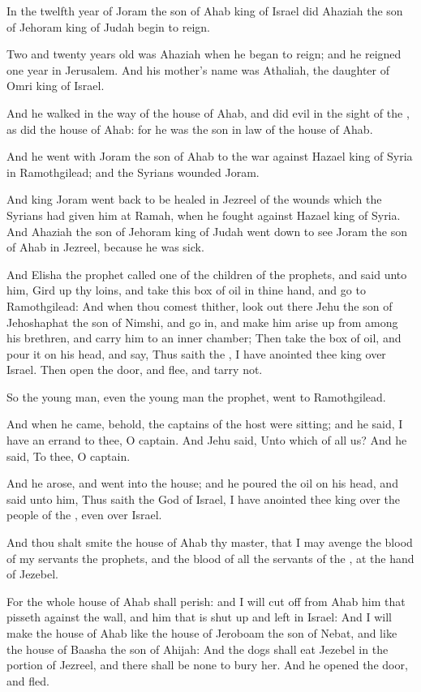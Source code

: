 \Verse In the twelfth year of Joram the son of Ahab king of Israel did Ahaziah the son of Jehoram king of Judah begin to reign.

\Verse Two and twenty years old was Ahaziah when he began to reign; and he reigned one year in Jerusalem. And his mother's name was Athaliah, the daughter of Omri king of Israel.

\Verse And he walked in the way of the house of Ahab, and did evil in the sight of the \LORD, as did the house of Ahab: for he was the son in law of the house of Ahab.

\Verse And he went with Joram the son of Ahab to the war against Hazael king of Syria in Ramothgilead; and the Syrians wounded Joram.

\Verse And king Joram went back to be healed in Jezreel of the wounds which the Syrians had given him at Ramah, when he fought against Hazael king of Syria. And Ahaziah the son of Jehoram king of Judah went down to see Joram the son of Ahab in Jezreel, because he was sick.


\Chapter
\Verse And Elisha the prophet called one of the children of the prophets, and said unto him, Gird up thy loins, and take this box of oil in thine hand, and go to Ramothgilead: \Verse And when thou comest thither, look out there Jehu the son of Jehoshaphat the son of Nimshi, and go in, and make him arise up from among his brethren, and carry him to an inner chamber; \Verse Then take the box of oil, and pour it on his head, and say, Thus saith the \LORD, I have anointed thee king over Israel.  Then open the door, and flee, and tarry not.

\Verse So the young man, even the young man the prophet, went to Ramothgilead.

\Verse And when he came, behold, the captains of the host were sitting; and he said, I have an errand to thee, O captain. And Jehu said, Unto which of all us? And he said, To thee, O captain.

\Verse And he arose, and went into the house; and he poured the oil on his head, and said unto him, Thus saith the \LORD God of Israel, I have anointed thee king over the people of the \LORD, even over Israel.

\Verse And thou shalt smite the house of Ahab thy master, that I may avenge the blood of my servants the prophets, and the blood of all the servants of the \LORD, at the hand of Jezebel.

\Verse For the whole house of Ahab shall perish: and I will cut off from Ahab him that pisseth against the wall, and him that is shut up and left in Israel: \Verse And I will make the house of Ahab like the house of Jeroboam the son of Nebat, and like the house of Baasha the son of Ahijah: \Verse And the dogs shall eat Jezebel in the portion of Jezreel, and there shall be none to bury her. And he opened the door, and fled.


